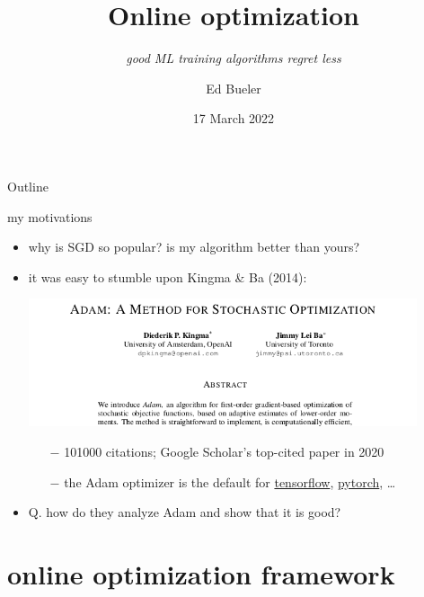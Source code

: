 \documentclass[svgnames,
               hyperref={colorlinks,citecolor=DeepPink4,linkcolor=FireBrick,urlcolor=Maroon},
               usepdftitle=false]  %
               {beamer}
\title[Online optimization]{Online optimization}
\subtitle{\emph{good ML training algorithms regret less}}
\author{Ed Bueler}
\institute[UAF]{MATH 692 Mathematics for Machine Learning}
\date[]{17 March 2022}
\begin{document}
\beamertemplatenavigationsymbolsempty

\begin{frame}
  \maketitle
\end{frame}


\begin{frame}{Outline}
  \tableofcontents[hideallsubsections]
\end{frame}


\begin{frame}{my motivations}

\begin{itemize}
\item why is SGD so popular? is my algorithm better than yours?

\medskip
\item it was easy to stumble upon Kingma \& Ba (2014):

\medskip
\begin{center}
\includegraphics[width=0.9\textwidth]{figs/adam-paper.png}
\end{center}

\medskip
    \begin{itemize}
    \item[$-$] 101000 citations; Google Scholar's top-cited paper in 2020
    \item[$-$] the Adam optimizer is the default for \href{https://www.tensorflow.org/tutorials/keras/classification}{tensorflow}, \href{https://pytorch.org/docs/stable/optim.html}{pytorch}, \dots
    \end{itemize}

\medskip
\item \alert{Q.} how do they analyze Adam and show that it is good?
\end{itemize}
\end{frame}


\section{online optimization framework}
\end{document}
